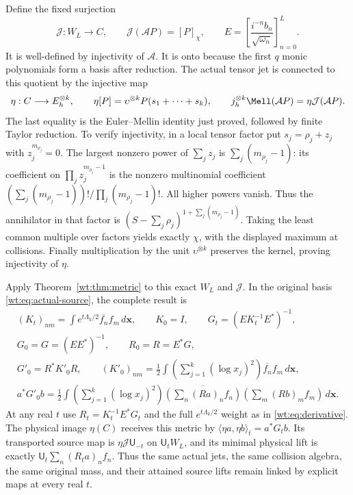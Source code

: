 Define the fixed surjection
\begin{equation}\label{wt:eq:actual-jet}
 \mathcal J:W_L\longrightarrow C,\qquad
 \mathcal J(\mathcal AP)=[P]_\chi,\qquad
 E=\left[\frac{i^{-n}b_n}{\sqrt{\omega_n}}\right]_{n=0}^L.
\end{equation}
It is well-defined by injectivity of $\mathcal A$.  It is onto
because the first $q$ monic polynomials form a basis after
reduction.  The actual tensor jet is connected to this quotient
by the injective map
\begin{equation}\label{wt:eq:eta}
 \eta:C\longrightarrow E_h^{\otimes k},\qquad
 \eta[P]=\upsilon^{\otimes k}P(s_1+\cdots+s_k),\qquad
 j_h^{\otimes k}\Mell(\mathcal AP)=\eta\mathcal J(\mathcal AP).
\end{equation}
The last equality is the Euler--Mellin identity just proved,
followed by finite Taylor reduction.  To verify injectivity,
in a local tensor factor put $s_j=\rho_j+z_j$ with
$z_j^{m_{\rho_j}}=0$.  The largest nonzero power of $\sum_jz_j$
is $\sum_j(m_{\rho_j}-1)$: its coefficient on
$\prod_jz_j^{m_{\rho_j}-1}$ is the nonzero multinomial
coefficient
$(\sum_j(m_{\rho_j}-1))!/\prod_j(m_{\rho_j}-1)!$.
All higher powers vanish.  Thus the annihilator in that factor
is $(S-\sum_j\rho_j)^{1+\sum_j(m_{\rho_j}-1)}$.
Taking the least common multiple over factors yields exactly
$\chi$, with the displayed maximum at collisions.  Finally
multiplication by the unit $\upsilon^{\otimes k}$ preserves
the kernel, proving injectivity of $\eta$.

Apply Theorem~\ref{wt:thm:metric} to this exact $W_L$ and
$\mathcal J$.  In the original basis \eqref{wt:eq:actual-source},
the complete result is
\begin{equation}\label{wt:eq:actual-derivative}
 \begin{gathered}
 (K_t)_{nm}=\int e^{t\Lambda_k/2}\overline{f_n}f_m\,d\mathbf x,
 \qquad K_0=I,\qquad
 G_t=(EK_t^{-1}E^*)^{-1},\\
 G_0=G=(EE^*)^{-1},\qquad R_0=R=E^*G,\\
 G'_0=R^*K'_0R,\qquad
 (K'_0)_{nm}=\frac12\int\left(\sum_{j=1}^k(\log x_j)^2\right)
                          \overline{f_n}f_m\,d\mathbf x,\\
 a^*G'_0b=\frac12\int\left(\sum_{j=1}^k(\log x_j)^2\right)
 \overline{\left(\sum_n(Ra)_nf_n\right)}
             \left(\sum_m(Rb)_mf_m\right)\,d\mathbf x.
 \end{gathered}
\end{equation}
At any real $t$ use $R_t=K_t^{-1}E^*G_t$ and the full
$e^{t\Lambda_k/2}$ weight as in \eqref{wt:eq:derivative}.
The physical image $\eta(C)$ receives this metric by
$\langle\eta a,\eta b\rangle_t=a^*G_tb$.  Its transported
source map is $\eta\mathcal J\mathsf U_{-t}$ on
$\mathsf U_tW_L$, and its minimal physical lift is exactly
$\mathsf U_t\sum_n(R_ta)_nf_n$.  Thus the same actual jets,
the same collision algebra, the same original mass, and their
attained source lifts remain linked by explicit maps at every
real $t$.

